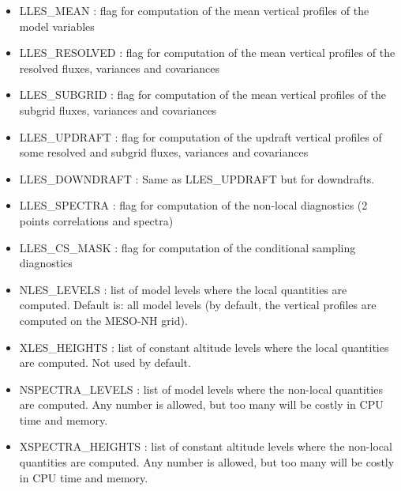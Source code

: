 \begin{itemize}
\item
LLES\_MEAN  : flag for computation of the
mean vertical profiles of the model variables

\item
LLES\_RESOLVED : flag for computation of the
mean vertical profiles of the resolved fluxes, variances and covariances

\item
LLES\_SUBGRID : flag for computation of the
mean vertical profiles of the subgrid fluxes, variances and covariances

\item
LLES\_UPDRAFT : flag for computation of the
updraft vertical profiles of some resolved and subgrid fluxes,
variances and covariances

\item
LLES\_DOWNDRAFT  : Same as LLES\_UPDRAFT but for downdrafts.
\item
LLES\_SPECTRA  : flag for computation of the
non-local diagnostics (2 points correlations and spectra)

\item
LLES\_CS\_MASK  : flag for computation of the
conditional sampling diagnostics                           
\item
NLES\_LEVELS : list of model levels where the local quantities
are computed. Default is: all model levels (by default, the vertical profiles
are computed on the MESO-NH grid).

\item
XLES\_HEIGHTS : list of constant altitude levels where
the local quantities are computed. Not used by default.

\item
NSPECTRA\_LEVELS  : list of model levels where the non-local quantities
are computed. Any number is allowed, but too many will be costly
in CPU time and memory.

\item
XSPECTRA\_HEIGHTS  : list of constant altitude levels where
the non-local quantities are computed. Any number is allowed,
but too many will be costly in CPU time and memory.


\end{itemize}
